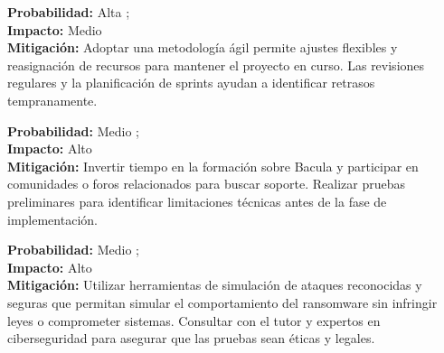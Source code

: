 



\newcommand{\alta}{\textcolor{red}{\ding{55}}}
\newcommand{\media}{\textcolor{orange}{\ding{51}}}
\newcommand{\baja}{\textcolor{green}{\ding{108}}}


\begin{tcolorbox}[riskbox, title=Riesgo 1: Retrasos en el Cronograma]
\textbf{Probabilidad:} Alta \alta; \\
\textbf{Impacto:} Medio \media\\
\textbf{Mitigación:} Adoptar una metodología ágil permite ajustes flexibles y reasignación de recursos para mantener el proyecto en curso. Las revisiones regulares y la planificación de sprints ayudan a identificar retrasos tempranamente.
\end{tcolorbox}

\begin{tcolorbox}[riskbox, title=Riesgo 2: Limitaciones Técnicas con Bacula]
\textbf{Probabilidad:} Medio \media; \\
\textbf{Impacto:} Alto \alta\\
\textbf{Mitigación:} Invertir tiempo en la formación sobre Bacula y participar en comunidades o foros relacionados para buscar soporte. Realizar pruebas preliminares para identificar limitaciones técnicas antes de la fase de implementación.
\end{tcolorbox}

\begin{tcolorbox}[riskbox, title=Riesgo 3: Dificultades en la Simulación de Ransomware]
\textbf{Probabilidad:} Medio \media; \\
\textbf{Impacto:} Alto \alta\\
\textbf{Mitigación:} Utilizar herramientas de simulación de ataques reconocidas y seguras que permitan simular el comportamiento del ransomware sin infringir leyes o comprometer sistemas. Consultar con el tutor y expertos en ciberseguridad para asegurar que las pruebas sean éticas y legales.
\end{tcolorbox}

